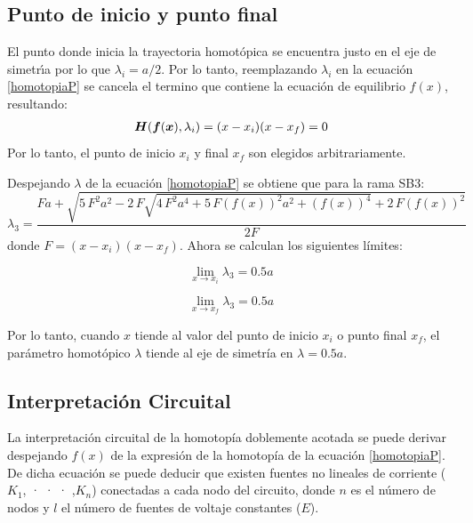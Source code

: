 \documentclass[conference,letterpaper,onecolumn]{IEEEtran}
\newcommand{\pig}[1]{\mbox{\boldmath ${#1}$}	}
\begin{document}
{\subsection{Punto de inicio y punto final}

El punto donde inicia la trayectoria homot\'opica se encuentra justo en el eje de simetr\'{\i}a 
por lo que $\lambda_i=a/2$. Por lo tanto, reemplazando $\lambda_i$ en la ecuaci\'on \ref{homotopiaP} se cancela el termino que contiene la ecuaci\'on de equilibrio $f(x)$, resultando:
\begin{displaymath}
\begin{array}{r}
\pig{H}(\pig{f}(\pig{x}),\lambda_i )=(x-x_i)(x-x_f)=0  \\
\end{array}
\end{displaymath}
Por lo tanto, el punto de inicio $x_i$  y final $x_f$ son elegidos arbitrariamente.


Despejando $\lambda$ de la ecuaci\'on \ref{homotopiaP} se obtiene que para la rama SB3:
{
\begin{displaymath}
\lambda_3= {\frac {Fa+\sqrt {5\,{F}^{2}{a}^{2}-2\,F\sqrt { 4\,{F}^{2}{a}^
{4}+5\,F \left( f \left( x \right)  \right) ^{2}{a}^{2}+ \left( f
 \left( x \right)  \right) ^{4}}+2\,F \left( f \left( x \right) 
 \right) ^{2}}}{2F}}
\end{displaymath}
}
donde $F=(x-x_i)(x-x_f)$. Ahora se calculan los siguientes l{\'i}mites:

\begin{equation}
 \displaystyle\lim_{x \to{x_i}}{\lambda_3}=0.5a 
 \label{demos1}
\end{equation}

\begin{equation}
  \displaystyle\lim_{x \to{x_f}}{\lambda_3}=0.5a
 \label{demos1}
\end{equation}

Por lo tanto, cuando $x$ tiende al valor del punto de inicio $x_i$ o punto final $x_f$,  el par\'ametro homot\'opico $\lambda$ tiende al eje de simetr{\'i}a en $\lambda=0.5a$.




\subsection{Interpretaci\'on Circuital}


La interpretaci\'on circuital de la homotop{\'i}a doblemente acotada se puede derivar
despejando $f(x)$ de la expresi\'on de la homotop\'ia de la ecuaci\'on \ref{homotopiaP}. De dicha ecuaci\'on se puede deducir que existen fuentes no lineales de corriente ($K_1$, · · · ,$K_n$) conectadas a cada nodo del circuito, donde $n$ es el n\'umero de nodos y $l$ el n\'umero de fuentes de voltaje constantes ($E$). 

}
\end{document}
